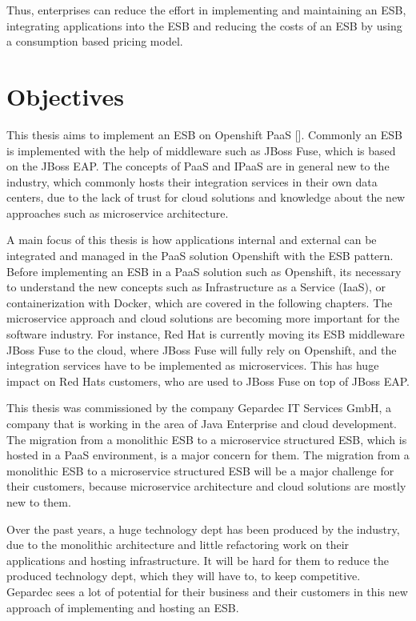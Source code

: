 Thus, enterprises can reduce the effort in implementing and maintaining an ESB, integrating applications into the ESB and reducing the costs of an ESB by using a consumption based pricing model.

\newpage
\section{Objectives}
\label{sec:intro-objectives}
This thesis aims to implement an ESB on Openshift PaaS [\cite{Openshift2018}]. Commonly an ESB is implemented with the help of middleware such as JBoss Fuse, which is based on the JBoss EAP. The concepts of PaaS and IPaaS are in general new to the industry, which commonly hosts their integration services in their own data centers, due to the lack of trust for cloud solutions and knowledge about the new approaches such as microservice architecture. 

A main focus of this thesis is how applications internal and external can be integrated and managed in the PaaS solution Openshift with the ESB pattern. Before implementing an ESB in a PaaS solution such as Openshift, its necessary to understand the new concepts such as Infrastructure as a Service (IaaS), or containerization with Docker, which are covered in the following chapters. The microservice approach and cloud solutions are becoming more important for the software industry. For instance, Red Hat is currently moving its ESB middleware JBoss Fuse to the cloud, where JBoss Fuse will fully rely on Openshift, and the integration services have to be implemented as microservices. This has huge impact on Red Hats customers, who are used to JBoss Fuse on top of JBoss EAP.

This thesis was commissioned by the company Gepardec IT Services GmbH, a company that is working in the area of Java Enterprise and cloud development. The migration from a monolithic ESB to a microservice structured ESB, which is hosted in a PaaS environment, is a major concern for them. The migration from a monolithic ESB to a microservice structured ESB will be a major challenge for their customers, because microservice architecture and cloud solutions are mostly new to them. 

Over the past years, a huge technology dept has been produced by the industry, due to the monolithic architecture and little refactoring work on their applications and hosting infrastructure. It will be hard for them to reduce the produced technology dept, which they will have to, to keep competitive. Gepardec sees a lot of potential for their business and their customers in this new approach of implementing and hosting an ESB.
 



